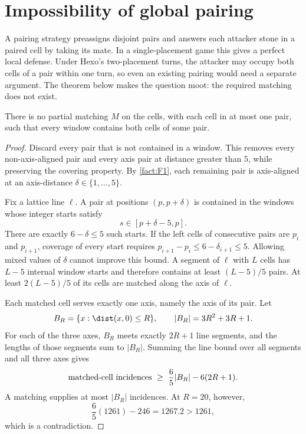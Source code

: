 \section{Impossibility of global pairing}
\label{sec:no-pairing}

A pairing strategy preassigns disjoint pairs and answers each attacker stone
in a paired cell by taking its mate.  In a single-placement game this gives a
perfect local defense.  Under Hexo's two-placement turns, the attacker may
occupy both cells of a pair within one turn, so even an existing pairing would
need a separate argument.  The theorem below makes the question moot: the
required matching does not exist.

\begin{theorem}
\label{thm:T8}
There is no partial matching $M$ on the cells, with each cell in at most one
pair, such that every window contains both cells of some pair.
\end{theorem}

\begin{proof}
Discard every pair that is not contained in a window.  This removes every
non-axis-aligned pair and every axis pair at distance greater than $5$, while
preserving the covering property.  By \cref{fact:F1}, each remaining pair is
axis-aligned at an axis-distance $\delta\in\{1,\ldots,5\}$.

Fix a lattice line $\ell$.  A pair at positions $(p,p+\delta)$ is contained
in the windows whose integer starts satisfy
\[
  s\in[p+\delta-5,p].
\]
There are exactly $6-\delta\le5$ such starts.  If the left cells of
consecutive pairs are $p_i$ and $p_{i+1}$, coverage of every start requires
$p_{i+1}-p_i\le6-\delta_{i+1}\le5$.  Allowing mixed values of $\delta$ cannot
improve this bound.  A segment of $\ell$ with $L$ cells has $L-5$ internal
window starts and therefore contains at least $(L-5)/5$ pairs.  At least
$2(L-5)/5$ of its cells are matched along the axis of $\ell$.

Each matched cell serves exactly one axis, namely the axis of its pair.  Let
\[
  B_R=\{x:\dist(x,0)\le R\},
  \qquad |B_R|=3R^2+3R+1.
\]
For each of the three axes, $B_R$ meets exactly $2R+1$ line segments, and the
lengths of those segments sum to $|B_R|$.  Summing the line bound over all
segments and all three axes gives
\[
  \textup{matched-cell incidences}
  \ \ge\ \frac65|B_R|-6(2R+1).
\]
A matching supplies at most $|B_R|$ incidences.  At $R=20$, however,
\[
  \frac65(1261)-246=1267.2>1261,
\]
which is a contradiction.
\end{proof}

